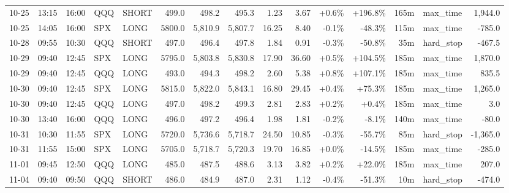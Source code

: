 \documentclass[11pt,a4paper,twoside]{article}
\begin{document}
\begin{landscape}
\begin{center}
\begin{longtable}{>{\color{txtmain}}l l l l l r r r r r r r r >{\color{txtmain}}l r}
10-25 & 13:15 & 16:00 & QQQ & SHORT & 499.0 & 498.2 & 495.3 & 1.23 & 3.67 & \textcolor{wingreen}{+0.6\%} & \textcolor{wingreen}{+196.8\%} & 165m & max\_time & \textcolor{wingreen}{1,944.0} \\
10-25 & 14:05 & 16:00 & SPX & LONG & 5800.0 & 5,810.9 & 5,807.7 & 16.25 & 8.40 & \textcolor{lossred}{-0.1\%} & \textcolor{lossred}{-48.3\%} & 115m & max\_time & \textcolor{lossred}{-785.0} \\
10-28 & 09:55 & 10:30 & QQQ & SHORT & 497.0 & 496.4 & 497.8 & 1.84 & 0.91 & \textcolor{lossred}{-0.3\%} & \textcolor{lossred}{-50.8\%} & 35m & hard\_stop & \textcolor{lossred}{-467.5} \\
10-29 & 09:40 & 12:45 & SPX & LONG & 5795.0 & 5,803.8 & 5,830.8 & 17.90 & 36.60 & \textcolor{wingreen}{+0.5\%} & \textcolor{wingreen}{+104.5\%} & 185m & max\_time & \textcolor{wingreen}{1,870.0} \\
10-29 & 09:40 & 12:45 & QQQ & LONG & 493.0 & 494.3 & 498.2 & 2.60 & 5.38 & \textcolor{wingreen}{+0.8\%} & \textcolor{wingreen}{+107.1\%} & 185m & max\_time & \textcolor{wingreen}{835.5} \\
10-30 & 09:40 & 12:45 & SPX & LONG & 5815.0 & 5,822.0 & 5,843.1 & 16.80 & 29.45 & \textcolor{wingreen}{+0.4\%} & \textcolor{wingreen}{+75.3\%} & 185m & max\_time & \textcolor{wingreen}{1,265.0} \\
10-30 & 09:40 & 12:45 & QQQ & LONG & 497.0 & 498.2 & 499.3 & 2.81 & 2.83 & \textcolor{wingreen}{+0.2\%} & \textcolor{wingreen}{+0.4\%} & 185m & max\_time & \textcolor{wingreen}{3.0} \\
10-30 & 13:40 & 16:00 & QQQ & LONG & 496.0 & 497.2 & 496.4 & 1.98 & 1.81 & \textcolor{lossred}{-0.2\%} & \textcolor{lossred}{-8.1\%} & 140m & max\_time & \textcolor{lossred}{-80.0} \\
10-31 & 10:30 & 11:55 & SPX & LONG & 5720.0 & 5,736.6 & 5,718.7 & 24.50 & 10.85 & \textcolor{lossred}{-0.3\%} & \textcolor{lossred}{-55.7\%} & 85m & hard\_stop & \textcolor{lossred}{-1,365.0} \\
10-31 & 11:55 & 15:00 & SPX & LONG & 5705.0 & 5,718.7 & 5,720.3 & 19.70 & 16.85 & \textcolor{wingreen}{+0.0\%} & \textcolor{lossred}{-14.5\%} & 185m & max\_time & \textcolor{lossred}{-285.0} \\
11-01 & 09:45 & 12:50 & QQQ & LONG & 485.0 & 487.5 & 488.6 & 3.13 & 3.82 & \textcolor{wingreen}{+0.2\%} & \textcolor{wingreen}{+22.0\%} & 185m & max\_time & \textcolor{wingreen}{207.0} \\
11-04 & 09:40 & 09:50 & QQQ & SHORT & 486.0 & 484.9 & 487.0 & 2.31 & 1.12 & \textcolor{lossred}{-0.4\%} & \textcolor{lossred}{-51.3\%} & 10m & hard\_stop & \textcolor{lossred}{-474.0} \\

\end{longtable}
\end{center}
\end{landscape}
\end{document}
